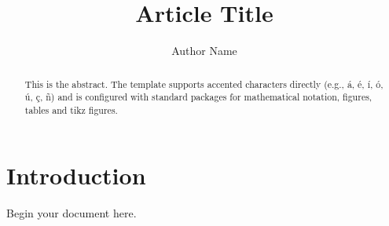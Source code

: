 \documentclass[12pt, a4paper]{article}
\title{Article Title}
\author{Author Name}
\date{}
\begin{document}
\maketitle

\begin{abstract}
    This is the abstract. The template supports accented characters directly (e.g., á, é, í, ó, ú, ç, ñ) and is configured with standard packages for mathematical notation, figures, tables and tikz figures.
\end{abstract}

\section{Introduction}
Begin your document here.
\end{document}
